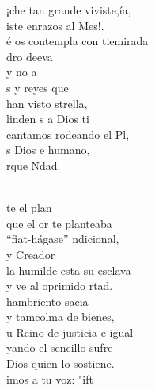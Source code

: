 \documentclass[12pt]{article}
\begin{document}
\begin{multicols*}{2}
\begin{cancion}
	\begin{chorus}%
	¡che tan grande viviste,ía, \\
	iste enrazos al Mes!.\\
	é os contempla con tiemirada\\
	dro deeva \\
	y no a   \\
	s y reyes que\\
	han visto strella,\\
	linden s a Dios ti\\
	 cantamos rodeando el Pl,\\
	s Dios e humano,  \\
	rque Ndad.\\
	\end{chorus}%
	\jump\\
	te el plan \\
	que el or te planteaba\\
	 “fiat-hágase” ndicional,\\
	y   Creador \\
	la humilde esta su esclava\\
	y ve al oprimido rtad.\\
	hambriento sacia \\
	y tamcolma de bienes,\\
	u Reino de justicia e igual\\
	yando el sencillo sufre \\
	Dios quien lo sostiene.\\
	imos a tu voz: "ift \\
\end{cancion}%


\end{multicols*}
\end{document}
